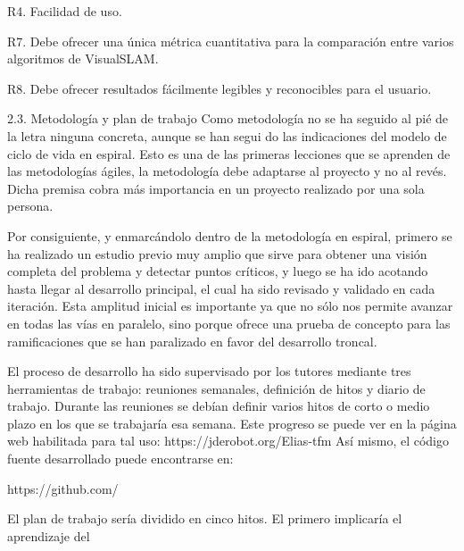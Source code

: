 	R4. Facilidad de uso.

	R7. Debe ofrecer una única métrica cuantitativa para la comparación entre varios algoritmos de VisualSLAM.

	R8. Debe ofrecer resultados fácilmente legibles y reconocibles para el usuario.

2.3. Metodología y plan de trabajo
Como metodología no se ha seguido al pié de la letra ninguna concreta, aunque se han segui do las indicaciones del modelo de ciclo de vida en espiral. Esto es una de las primeras lecciones que se aprenden de las metodologías ágiles, la metodología debe adaptarse al proyecto y no al revés. Dicha premisa cobra más importancia en un proyecto realizado por una sola persona.

Por consiguiente, y enmarcándolo dentro de la metodología en espiral, primero se ha realizado un estudio previo muy amplio que sirve para obtener una visión completa del problema y detectar puntos críticos, y luego se ha ido acotando hasta llegar al desarrollo principal, el cual ha sido revisado y validado en cada iteración. Esta amplitud inicial es importante ya que no sólo nos permite avanzar en todas las vías en paralelo, sino porque ofrece una prueba de concepto para las ramificaciones que se han paralizado en favor del desarrollo troncal.

El proceso de desarrollo ha sido supervisado por los tutores mediante tres herramientas de trabajo: reuniones semanales, definición de hitos y diario de trabajo.
Durante las reuniones se debían definir varios hitos de corto o medio plazo en los que se trabajaría esa semana. Este progreso se puede ver en la página web habilitada para tal uso:
https://jderobot.org/Elias-tfm
Así mismo, el código fuente desarrollado puede encontrarse en:

https://github.com/

El plan de trabajo sería dividido en cinco hitos. El primero implicaría el aprendizaje del

